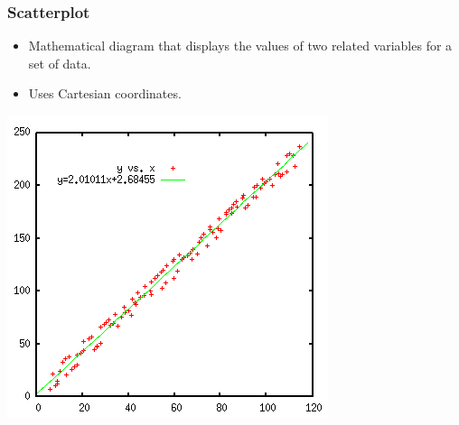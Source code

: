 \documentclass{beamer}
\begin{document}
\begin{frame}
\frametitle{Scatterplot}
\begin{itemize}
\item Mathematical diagram that displays the values of two related variables for a set of data.
\item Uses Cartesian coordinates.
\end{itemize}
\begin{center}
\includegraphics[scale=0.45]{scatterpot1}
\end{center}
\end{frame}
\end{document}
